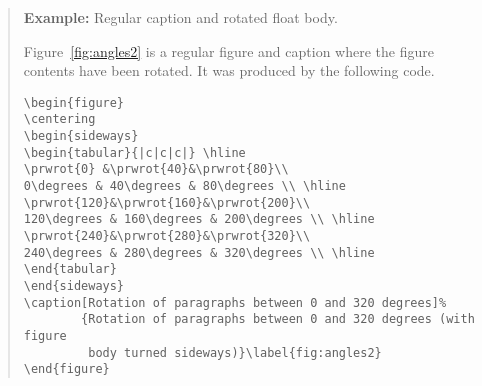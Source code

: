 \documentclass[11pt]{article}
\newenvironment{example}{\begin{quotation}\small\textbf{Example: }}{\par\end{quotation}}
\begin{document}
\begin{example}Regular caption and rotated float body.

Figure~\ref{fig:angles2} is a regular figure and caption where the figure
contents have been rotated. It was produced by the following code.
\begin{verbatim}
\begin{figure}
\centering
\begin{sideways}
\begin{tabular}{|c|c|c|} \hline
\prwrot{0} &\prwrot{40}&\prwrot{80}\\
0\degrees & 40\degrees & 80\degrees \\ \hline
\prwrot{120}&\prwrot{160}&\prwrot{200}\\
120\degrees & 160\degrees & 200\degrees \\ \hline
\prwrot{240}&\prwrot{280}&\prwrot{320}\\
240\degrees & 280\degrees & 320\degrees \\ \hline
\end{tabular}
\end{sideways}
\caption[Rotation of paragraphs between 0 and 320 degrees]%
        {Rotation of paragraphs between 0 and 320 degrees (with figure
         body turned sideways)}\label{fig:angles2}
\end{figure}
\end{verbatim}
\end{example} %
\end{document}
